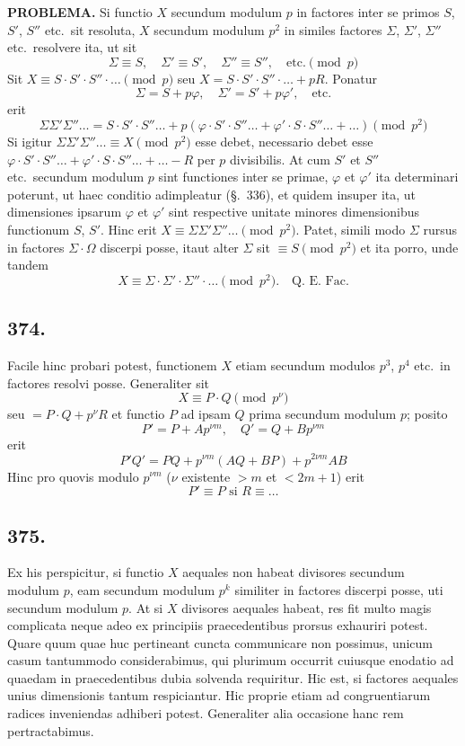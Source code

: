 \documentclass[12pt]{article}
\newcommand{\Sec}{\S}
\begin{document}
\textbf{PROBLEMA.} Si functio $X$ secundum modulum $p$ in factores inter se primos $S$, $S'$, $S''$ etc.~sit resoluta, $X$ secundum modulum $p^2$ in similes factores $\Sigma$, $\Sigma'$, $\Sigma''$ etc.~resolvere ita, ut sit
\[
\Sigma\equiv S,\quad \Sigma'\equiv S',\quad \Sigma''\equiv S'',\quad \text{etc.}\pmod{p}
\]
Sit $X\equiv S\cdot S'\cdot S''\cdot\ldots\pmod{p}$ seu $X=S\cdot S'\cdot S''\cdot\ldots+pR$. Ponatur
\[
\Sigma = S+p\varphi,\quad \Sigma'=S'+p\varphi',\quad \text{etc.}
\]
erit
\[
\Sigma\Sigma'\Sigma''\ldots = S\cdot S'\cdot S''\ldots + p(\varphi\cdot S'\cdot S''\ldots + \varphi'\cdot S\cdot S''\ldots + \ldots) \pmod{p^2}
\]
Si igitur $\Sigma\Sigma'\Sigma''\ldots\equiv X\pmod{p^2}$ esse debet, necessario debet esse $\varphi\cdot S'\cdot S''\ldots + \varphi'\cdot S\cdot S''\ldots + \ldots - R$ per $p$ divisibilis. At cum $S'$ et $S''$ etc.~secundum modulum $p$ sint functiones inter se primae, $\varphi$ et $\varphi'$ ita determinari poterunt, ut haec conditio adimpleatur (\Sec.~336), et quidem insuper ita, ut dimensiones ipsarum $\varphi$ et $\varphi'$ sint respective unitate minores dimensionibus functionum $S$, $S'$. Hinc erit $X\equiv\Sigma\Sigma'\Sigma''\ldots\pmod{p^2}$. Patet, simili modo $\Sigma$ rursus in factores $\Sigma\cdot\Omega$ discerpi posse, itaut alter $\Sigma$ sit $\equiv S\pmod{p^2}$ et ita porro, unde tandem
\[
X \equiv \Sigma\cdot\Sigma'\cdot\Sigma''\cdot\ldots \pmod{p^2}. \quad \text{Q.~E.~Fac.}
\]

\subsection*{374.}

Facile hinc probari potest, functionem $X$ etiam secundum modulos $p^3$, $p^4$ etc.~in factores resolvi posse. Generaliter sit
\[
X\equiv P\cdot Q\pmod{p^\nu}
\]
seu $=P\cdot Q+p^\nu R$ et functio $P$ ad ipsam $Q$ prima secundum modulum $p$; posito
\[
P'=P+Ap^{\nu m},\quad Q'=Q+Bp^{\nu m}
\]
erit
\[
P'Q' = PQ + p^{\nu m}(AQ+BP) + p^{2\nu m}AB
\]
Hinc pro quovis modulo $p^{\nu m}$ ($\nu$ existente $>m$ et $<2m+1$) erit
\[
P'\equiv P \text{ si } R\equiv \ldots
\]

\subsection*{375.}

Ex his perspicitur, si functio $X$ aequales non habeat divisores secundum modulum $p$, eam secundum modulum $p^k$ similiter in factores discerpi posse, uti secundum modulum $p$. At si $X$ divisores aequales habeat, res fit multo magis complicata neque adeo ex principiis praecedentibus prorsus exhauriri potest. Quare quum quae huc pertineant cuncta communicare non possimus, unicum casum tantummodo considerabimus, qui plurimum occurrit cuiusque enodatio ad quaedam in praecedentibus dubia solvenda requiritur. Hic est, si factores aequales unius dimensionis tantum respiciantur. Hic proprie etiam ad congruentiarum radices inveniendas adhiberi potest. Generaliter alia occasione hanc rem pertractabimus.
\end{document}
